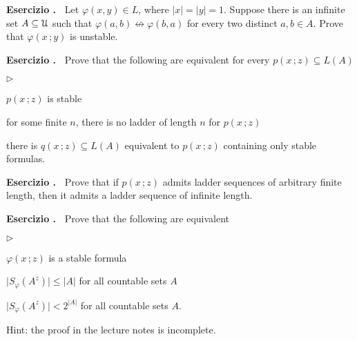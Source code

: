 \documentclass[10pt]{article}
\def\phi{\varphi}
\def\U{\EuScript U}
\def\niff{\nleftrightarrow}
\newcommand{\labella}[1]{{\sf\footnotesize #1}\hfill}
\renewenvironment{itemize}
  {\begin{list}{$\triangleright$}{%
   \setlength{\parskip}{0mm}
   \setlength{\topsep}{0mm}
   \setlength{\rightmargin}{0mm}
   \setlength{\listparindent}{0mm}
   \setlength{\itemindent}{0mm}
   \setlength{\labelwidth}{3ex}
   \setlength{\itemsep}{0mm}
   \setlength{\parsep}{0mm}
   \setlength{\partopsep}{0mm}
   \setlength{\labelsep}{1ex}
   \setlength{\leftmargin}{\labelwidth+\labelsep}
   \let\makelabel\labella}}{%
  \end{list}}
\newcounter{ex}
\newenvironment{exercise}{\medskip\addtocounter{ex}{1}\textbf{Esercizio \theex.\ }}{}
\begin{document}
\begin{exercise}
  Let $\phi(x,y)\in  L$, where $|x|=|y|=1$.
  Suppose there is an infinite set $A\subseteq\U$ such that $\phi(a,b)\niff\phi(b,a)$ for every two distinct $a,b\in A$.
  Prove that $\phi(x\,;y)$ is unstable.
\end{exercise}

\begin{exercise}
  Prove that the following are equivalent for every $p(x\,;z)\subseteq L(A)$
  \begin{itemize}
    \item [1.] $p(x\,;z)$ is stable
    \item [2.] for some finite $n$, there is no ladder of length $n$ for $p(x\,;z)$
    \item [3.] there is $q(x\,;z)\subseteq L(A)$ equivalent to $p(x\,;z)$ containing only stable formulas.
  \end{itemize}
\end{exercise}

\begin{exercise}
  Prove that if $p(x\,;z)$ admits ladder sequences of arbitrary finite length, then it admits a ladder sequence of infinite length.
\end{exercise}

\begin{exercise}
Prove that the following are equivalent
\begin{itemize}
\item[1.] $\phi(x\,;z)$ is a stable formula
\item[2.] $\big|S_{\phi}(A^z)\big|\le|A|$ for all countable sets $A$
\item[3.] $\big|S_{\phi}(A^z)\big|<2^{|A|}$ for all countable sets $A$.
\end{itemize}
Hint: the proof in the lecture notes is incomplete.
\end{exercise}
\end{document}
